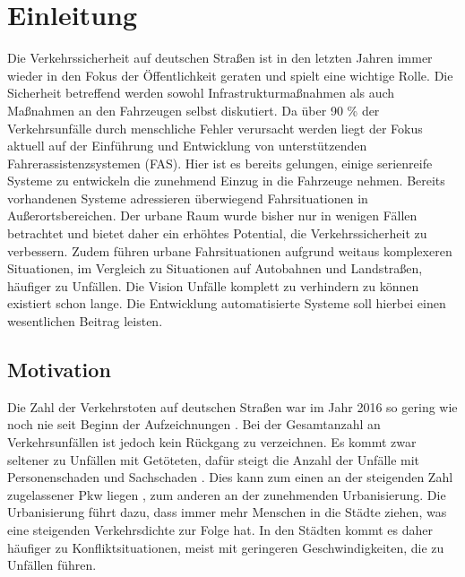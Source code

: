 
\chapter{Einleitung}\label{chapter:Motivation}
Die Verkehrssicherheit auf deutschen Straßen ist in den letzten Jahren immer wieder in den Fokus der Öffentlichkeit geraten und spielt eine wichtige Rolle. Die Sicherheit betreffend werden sowohl Infrastrukturmaßnahmen als auch Maßnahmen an den Fahrzeugen selbst diskutiert. Da über 90 \% \parencite[S. 48]{DEKRA.2017} der Verkehrsunfälle durch menschliche Fehler verursacht werden liegt der Fokus aktuell auf der Einführung und Entwicklung von unterstützenden Fahrerassistenzsystemen (FAS). Hier ist es bereits gelungen, einige serienreife  Systeme zu entwickeln die zunehmend Einzug in die Fahrzeuge nehmen. Bereits vorhandenen Systeme adressieren überwiegend Fahrsituationen in Außerortsbereichen. Der urbane Raum wurde bisher nur in wenigen Fällen betrachtet und bietet daher ein erhöhtes Potential, die Verkehrssicherheit zu verbessern. Zudem führen urbane Fahrsituationen aufgrund weitaus komplexeren Situationen, im Vergleich zu Situationen auf Autobahnen und Landstraßen, häufiger zu Unfällen. Die Vision Unfälle komplett zu verhindern zu können existiert schon lange. Die Entwicklung automatisierte Systeme soll hierbei einen wesentlichen Beitrag leisten. 

\section{Motivation}
Die Zahl der Verkehrstoten auf deutschen Straßen war im Jahr 2016 so gering wie noch nie seit Beginn der Aufzeichnungen \parencite[S. 5]{StatistischesBundesamt.2018}. Bei der Gesamtanzahl an Verkehrsunfällen ist jedoch kein Rückgang zu verzeichnen. Es kommt zwar seltener zu Unfällen mit Getöteten, dafür steigt die Anzahl der Unfälle mit Personenschaden und Sachschaden \parencite[S. 5]{StatistischesBundesamt.2018}. Dies kann zum einen an der steigenden Zahl zugelassener Pkw liegen \parencite[S. 5]{StatistischesBundesamt.2018}, zum anderen an der zunehmenden Urbanisierung. Die Urbanisierung führt dazu, dass immer mehr Menschen in die Städte ziehen, was eine steigenden Verkehrsdichte zur Folge hat. In den Städten kommt es daher häufiger zu Konfliktsituationen, meist mit geringeren Geschwindigkeiten, die zu Unfällen führen.

